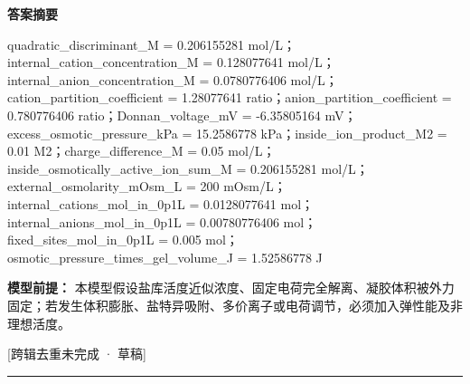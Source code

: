 \documentclass[UTF8,11pt,a4paper]{ctexart}
\begin{document}
\noindent\textbf{答案摘要}\par
quadratic\_discriminant\_M = 0.206155281 mol/L；internal\_cation\_concentration\_M = 0.128077641 mol/L；internal\_anion\_concentration\_M = 0.0780776406 mol/L；cation\_partition\_coefficient = 1.28077641 ratio；anion\_partition\_coefficient = 0.780776406 ratio；Donnan\_voltage\_mV = -6.35805164 mV；excess\_osmotic\_pressure\_kPa = 15.2586778 kPa；inside\_ion\_product\_M2 = 0.01 M2；charge\_difference\_M = 0.05 mol/L；inside\_osmotically\_active\_ion\_sum\_M = 0.206155281 mol/L；external\_osmolarity\_mOsm\_L = 200 mOsm/L；internal\_cations\_mol\_in\_0p1L = 0.0128077641 mol；internal\_anions\_mol\_in\_0p1L = 0.00780776406 mol；fixed\_sites\_mol\_in\_0p1L = 0.005 mol；osmotic\_pressure\_times\_gel\_volume\_J = 1.52586778 J\par
\noindent\textbf{模型前提：}
本模型假设盐库活度近似浓度、固定电荷完全解离、凝胶体积被外力固定；若发生体积膨胀、盐特异吸附、多价离子或电荷调节，必须加入弹性能及非理想活度。\par
\noindent\textcolor{red!65!black}{[跨辑去重未完成 · 草稿]} \par
\medskip\hrule\medskip
{}
\end{document}
